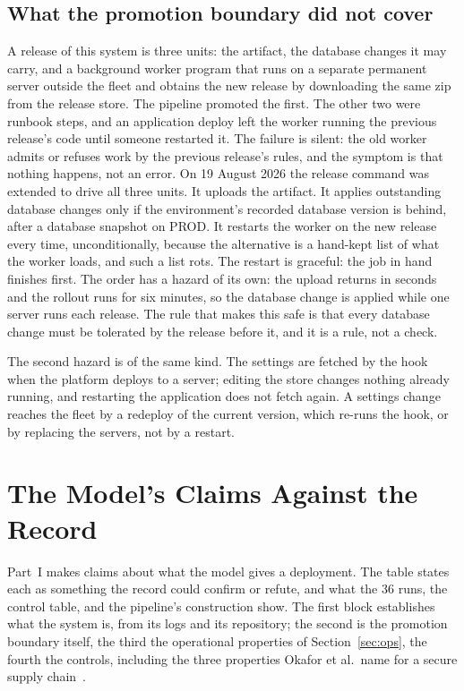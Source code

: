 \documentclass[11pt]{article}
\begin{document}
\subsection{What the promotion boundary did not cover}

A release of this system is three units: the artifact, the database changes it may carry, and a background worker program that runs on a separate permanent server outside the fleet and obtains the new release by downloading the same zip from the release store. The pipeline promoted the first. The other two were runbook steps, and an application deploy left the worker running the previous release's code until someone restarted it. The failure is silent: the old worker admits or refuses work by the previous release's rules, and the symptom is that nothing happens, not an error. On 19 August 2026 the release command was extended to drive all three units. It uploads the artifact. It applies outstanding database changes only if the environment's recorded database version is behind, after a database snapshot on PROD. It restarts the worker on the new release every time, unconditionally, because the alternative is a hand-kept list of what the worker loads, and such a list rots. The restart is graceful: the job in hand finishes first. The order has a hazard of its own: the upload returns in seconds and the rollout runs for six minutes, so the database change is applied while one server runs each release. The rule that makes this safe is that every database change must be tolerated by the release before it, and it is a rule, not a check.

The second hazard is of the same kind. The settings are fetched by the hook when the platform deploys to a server; editing the store changes nothing already running, and restarting the application does not fetch again. A settings change reaches the fleet by a redeploy of the current version, which re-runs the hook, or by replacing the servers, not by a restart.

\section{The Model's Claims Against the Record}

Part~I makes claims about what the model gives a deployment. The table states each as something the record could confirm or refute, and what the 36 runs, the control table, and the pipeline's construction show. The first block establishes what the system is, from its logs and its repository; the second is the promotion boundary itself, the third the operational properties of Section~\ref{sec:ops}, the fourth the controls, including the three properties Okafor et al.\ name for a secure supply chain~\cite{Okafor}.
\end{document}
